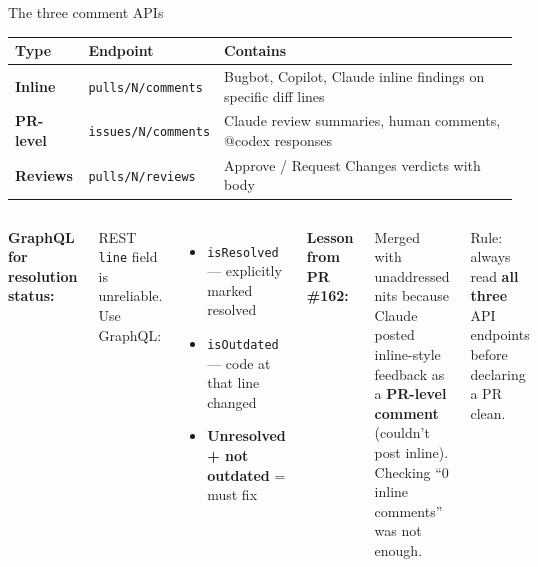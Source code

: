 \documentclass[aspectratio=169,10pt]{beamer}
\begin{document}
\begin{frame}{The three comment APIs}
    \vspace{-0.4em}
    \begin{center}
    \renewcommand{\arraystretch}{1.2}
    {\footnotesize
    \begin{tabular}{@{}l l p{5.5cm}@{}}
        \toprule
        \textbf{Type} & \textbf{Endpoint} & \textbf{Contains} \\
        \midrule
        \textbf{Inline} & \texttt{pulls/N/comments} & Bugbot, Copilot, Claude inline findings on specific diff lines \\
        \textbf{PR-level} & \texttt{issues/N/comments} & Claude review summaries, human comments, @codex responses \\
        \textbf{Reviews} & \texttt{pulls/N/reviews} & Approve / Request Changes verdicts with body \\
        \bottomrule
    \end{tabular}
    }
    \end{center}
    \vspace{0.4em}
    \begin{columns}[T]
        \textcolor{leanblue}{\textbf{GraphQL for resolution status:}}
        \vspace{0.2em}

        {\scriptsize REST \texttt{line} field is unreliable. Use GraphQL:}
        \begin{itemize}
            \item \texttt{isResolved} --- explicitly marked resolved
            \item \texttt{isOutdated} --- code at that line changed
            \item \textbf{Unresolved + not outdated} = must fix
        \end{itemize}

        \textcolor{softred}{\textbf{Lesson from PR \#162:}}
        \vspace{0.2em}

        {\scriptsize Merged with unaddressed nits because Claude posted inline-style feedback as a \textbf{PR-level comment} (couldn't post inline). Checking ``0 inline comments'' was not enough.}
        \vspace{0.3em}

        {\scriptsize\textcolor{amber}{Rule: always read \textbf{all three} API endpoints before declaring a PR clean.}}
    \end{columns}
\end{frame}
\end{document}
